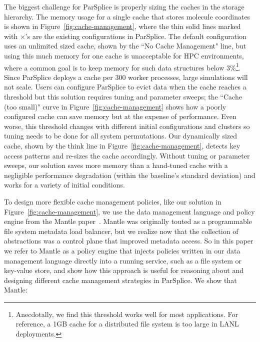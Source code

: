 The biggest challenge for ParSplice is properly sizing the caches in the
storage hierarchy.  The memory usage for a single cache that stores molecule
coordinates is shown in Figure~\ref{fig:cache-management}, where the thin solid
lines marked with \(\times\)'s are the existing configurations in ParSplice.
The default configuration uses an unlimited sized cache, shown by the ``No
Cache Management" line, but using this much memory for one cache is
unacceptable for HPC environments, where a common goal is to keep memory for
such data structures below 3\%\footnote{Anecdotally, we find this threshold
works well for most applications.  For reference, a 1GB cache for a distributed
file system is too large in LANL deployments.}. Since ParSplice deploys a cache
per 300 worker processes, large simulations will not scale. Users can configure
ParSplice to evict data when the cache reaches a threshold but this solution
requires tuning and parameter sweeps; the ``Cache (too small)" curve in
Figure~\ref{fig:cache-management} shows how a poorly configured cache can save
memory but at the expense of performance.  Even worse, this threshold changes
with different initial configurations and clusters so tuning needs to be done
for all system permutations.  Our dynamically sized cache, shown by the think
line in Figure~\ref{fig:cache-management}, detects key access patterns and
re-sizes the cache accordingly.  Without tuning or parameter sweeps, our
solution saves more memory than a hand-tuned cache with a negligible
performance degradation (within the baseline's standard deviation) and works
for a variety of initial conditions.

To design more flexible cache management policies, like our solution in
Figure~\ref{fig:cache-management}, we use the data management language and
policy engine from the Mantle paper~\cite{sevilla:sc15-mantle}.  Mantle was
originally touted as a programmable file system metadata load balancer, but we
realize now that the collection of abstractions was a control plane that
improved metadata access. So in this paper we refer to Mantle as a policy
engine that injects policies written in our data management language directly
into a running service, such as a file system or key-value store, and show how
this approach is useful for reasoning about and designing different cache
management strategies in ParSplice.  We show that Mantle:

